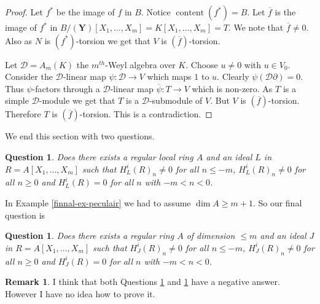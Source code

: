 \documentclass{amsart}
\newcommand{\D}{\mathcal{D} }
\newcommand{\bY}{\mathbf{Y} }
\newcommand{\rt}{\rightarrow}
\newcommand{\ov}{\overline}
\newcommand{\content}{\operatorname{content}}
\theoremstyle{plain}
\newtheorem{question}[theorem]{Question}
\theoremstyle{definition}
\newtheorem{remark}[theorem]{Remark}
\theoremstyle{remark}
\begin{document}
\begin{proof}
 Let $f^* $ be the image of $f$ in $B$. Notice $\content(f^*) = B$. Let $\ov{f}$ is the image of $f^*$ in $B/(\bY)[X_1,\ldots, X_m] = K[X_1,\ldots, X_m] = T$. We note that $\ov{f} \neq 0$. Also as $N$ is $(f^*)$-torsion we get that $V$ is $(\ov{f})$-torsion.
 
Let $\D = A_m(K)$ the $m^{th}$-Weyl algebra over $K$.
 Choose $u \neq 0 $ with $ u \in V_0$. Consider the $\D$-linear map $\psi \colon \D \rt V$ which maps $1$ to $u$. Clearly $\psi(\D\partial) = 0$. Thus $\psi$-factors 
 through a $\D$-linear map $\ov{\psi} \colon T \rt V$ which is non-zero. As $T$ is a simple $\D$-module we get that
  $T$ is a $\D$-submodule of $V$. But $V$ is $(\ov{f})$-torsion. Therefore $T$ is $(\ov{f})$-torsion. This is a contradiction.
 \end{proof}

We end this section with two questions.
\begin{question}\label{local-ex4}
Does there exists a  regular local ring $A$  and an ideal $L$  in $R = A[X_1,\ldots, X_m]$ such that 
$H^i_L(R)_n \neq 0$ for all $n \leq -m$, $H^i_L(R)_n \neq 0$ for all $n \geq 0$ and $H^i_L(R) = 0$ for all $n$ with $-m < n < 0$.
\end{question} 
 In Example \ref{finnal-ex-peculair} we had to assume $\dim A \geq m + 1$. So our final question is
 \begin{question}\label{global-ex4}
Does there exists a  regular  ring $A$ of dimension $\leq m$ and an ideal $J$  in $R = A[X_1,\ldots, X_m]$ such that 
$H^i_J(R)_n \neq 0$ for all $n \leq -m$, $H^i_J(R)_n \neq 0$ for all $n \geq 0$ and $H^i_J(R) = 0$ for all $n$ with $-m < n < 0$.
\end{question} 
\begin{remark}
I think that both Questions \ref{local-ex4} and \ref{global-ex4} have a negative answer. However I have no idea how to prove it.
\end{remark}
\end{document}
